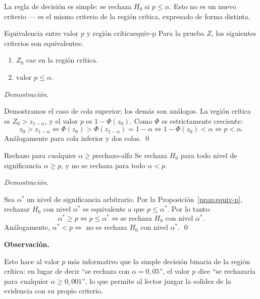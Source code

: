 \documentclass[12pt, a4paper]{book}
\newenvironment{observacion}{%
    \par\medskip\noindent\textbf{\color{azul}Observaci\'{o}n.}\enspace\itshape
}{\par\medskip}
\renewenvironment{proof}{%
    \par\medskip\noindent\textit{Demostraci\'{o}n.}\enspace
}{\qed\par\medskip}
\numberwithin{equation}{chapter}
\begin{document}
La regla de decisi\'{o}n es simple: se rechaza
$H_0$ si $p \leq \alpha$. Esto no es un nuevo
criterio --- es el mismo criterio de la
regi\'{o}n cr\'{i}tica, expresado de forma
distinta.

\begin{proposicion}{Equivalencia entre valor $p$
		y regi\'{o}n cr\'{i}tica}{equiv-p}
	Para la prueba $Z$, los siguientes criterios
	son equivalentes:
	\begin{enumerate}[label=\textit{\roman*.}]
		\item $Z_0$ cae en la regi\'{o}n cr\'{i}tica.
		\item $\text{valor } p \leq \alpha$.
	\end{enumerate}
\end{proposicion}

\begin{proof}
	Demostramos el caso de cola superior; los
	dem\'{a}s son an\'{a}logos. La regi\'{o}n
	cr\'{i}tica es $Z_0 > z_{1-\alpha}$, y el
	valor $p$ es $1 - \Phi(z_0)$. Como $\Phi$
	es estrictamente creciente:
	\[
	z_0 > z_{1-\alpha}
	\iff \Phi(z_0) > \Phi(z_{1-\alpha})
	= 1 - \alpha
	\iff 1 - \Phi(z_0) < \alpha
	\iff p < \alpha.
	\]
	An\'{a}logamente para cola inferior y dos
	colas. \qedhere
\end{proof}

\begin{corolario}{Rechazo para cualquier $\alpha
		\geq p$}{rechazo-alfa}
	Se rechaza $H_0$ para todo nivel de
	significancia $\alpha \geq p$, y no se
	rechaza para todo $\alpha < p$.
\end{corolario}

\begin{proof}
	Sea $\alpha^*$ un nivel de significancia
	arbitrario. Por la
	Proposici\'{o}n~\ref{prop:equiv-p}, rechazar
	$H_0$ con nivel $\alpha^*$ es equivalente
	a que $p \leq \alpha^*$. Por lo tanto:
	\[
	\alpha^* \geq p
	\iff p \leq \alpha^*
	\iff \text{se rechaza } H_0
	\text{ con nivel } \alpha^*.
	\]
	An\'{a}logamente, $\alpha^* < p \iff$ no
	se rechaza $H_0$ con nivel $\alpha^*$.
	\qedhere
\end{proof}

\begin{observacion}
	Esto hace al valor $p$ m\'{a}s informativo
	que la simple decisi\'{o}n binaria de la
	regi\'{o}n cr\'{i}tica: en lugar de decir
	``se rechaza con $\alpha = 0{,}05$'', el
	valor $p$ dice ``se rechazar\'{i}a para
	cualquier $\alpha \geq 0{,}001$'', lo que
	permite al lector juzgar la solidez de la
	evidencia con su propio criterio.
\end{observacion}
\end{document}
